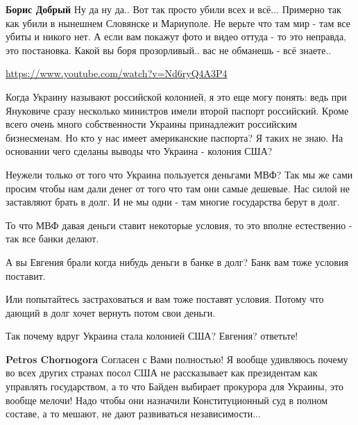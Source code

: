 \begin{itemize}
\begin{itemize}

\textbf{Борис Добрый} Ну да ну да.. Вот так просто убили всех и всё... Примерно
так как убили в нынешнем Словянске и Мариуполе. Не верьте что там мир - там все
убиты и никого нет. А если вам покажут фото и видео оттуда - то это неправда,
это постановка.  Какой вы боря прозорливый.. вас не обманешь - всё знаете..

\url{https://www.youtube.com/watch?v=Nd6ryQ4A3P4}

\end{itemize}



Когда Украину называют российской колонией, я это еще могу понять: ведь при
Януковиче сразу несколько министров имели второй паспорт российский. Кроме
всего очень много собственности Украины принадлежит российским бизнесменам. Но
кто у нас имеет американские паспорта? Я таких не знаю. На основании чего
сделаны выводы что Украина - колония США?

Неужели только от того что Украина пользуется деньгами МВФ? Так мы же сами
просим чтобы нам дали денег от того что там они самые дешевые. Нас силой не
заставляют брать в долг. И не мы одни - там многие государства берут в долг.

То что МВФ давая деньги ставит некоторые условия, то это вполне естественно -
так все банки делают.

А вы Евгения брали когда нибудь деньги в банке в долг? Банк вам тоже условия
поставит.

Или попытайтесь застраховаться и вам тоже поставят условия. Потому что дающий в
долг хочет вернуть потом свои деньги.

Так почему вдруг Украина стала колонией США? Евгения? ответьте!

\begin{itemize}

\textbf{Petros Chornogora} Согласен с Вами полностью! Я вообще удивляюсь почему
во всех других странах посол США не рассказывает как президентам как управлять
государством, а то что Байден выбирает прокурора для Украины, это вообще
мелочи! Надо чтобы они назначили Конституционный суд в полном составе, а то
мешают, не дают развиваться независимости...
\end{itemize}


\end{itemize}
